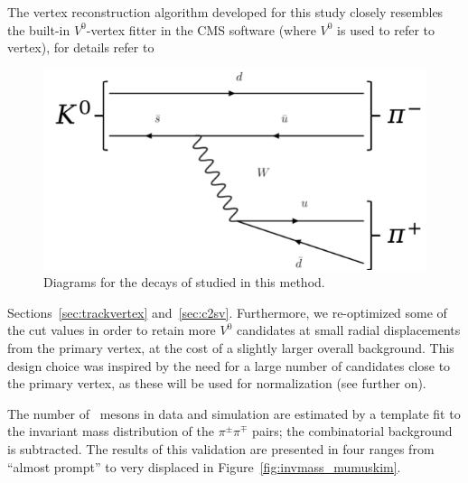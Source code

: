 The vertex reconstruction algorithm developed for this study closely
resembles the built-in $V^0$-vertex fitter in the CMS software (where
$V^0$ is used to refer to
 \PKzS vertex), for details refer to
\begin{figure}
   \includegraphics[width=0.8\linewidth]{Figures/c6/efficiencies/diagram_ks}
   \caption{Diagrams for the decays of \PKzS studied in this method.}
    \label{fig:svdiagrams}
\end{figure}
Sections~\ref{sec:trackvertex} and~\ref{sec:c2sv}.
Furthermore, we re-optimized some of the cut
values in order to retain more $V^0$ candidates at small radial
displacements from the primary vertex, at the cost of a slightly
larger overall background. This design choice was inspired by the need
for a large number of candidates close to the primary vertex, as these
will be used for normalization (see further on). 

The number of \PKzS~mesons in data and simulation
are estimated by a template fit to the invariant mass distribution of the $\pi^{\pm}\pi^{\mp}$
pairs; the combinatorial background is subtracted. The results of this
validation are presented in four \Deltwod ranges
from ``almost prompt'' to very displaced in Figure~\ref{fig:invmass_mumuskim}.

